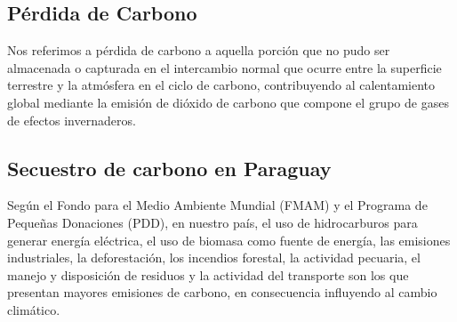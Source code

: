 \subsection{P\'erdida de Carbono}
Nos referimos a p\'erdida de carbono a aquella porci\'on que no pudo ser almacenada o capturada en el intercambio normal que ocurre entre la superficie terrestre y la atm\'osfera en el ciclo de carbono, contribuyendo al calentamiento global mediante la emisión de di\'oxido de carbono que compone el grupo de gases de efectos invernaderos.
\subsection{Secuestro de carbono en Paraguay}
Seg\'un el Fondo para el Medio Ambiente Mundial (FMAM) y el Programa de Peque\~{n}as Donaciones (PDD), en nuestro pa\'is, el uso de hidrocarburos para generar energ\'ia el\'ectrica, el uso de biomasa como fuente de energ\'ia, las emisiones industriales, la deforestaci\'on, los incendios forestal, la actividad pecuaria, el manejo y disposici\'on de residuos y la actividad del transporte son los que presentan mayores emisiones de carbono, en consecuencia influyendo al cambio clim\'atico\cite{cecilia2010Proyecto}.
